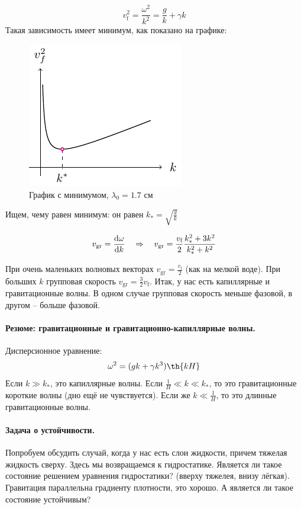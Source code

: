\begin{equation}
    v_\text{f}^2 = \frac{\omega^2}{k^2} = \frac{g}{k}+\gamma k 
\end{equation}
Такая зависимость имеет минимум, как показано на графике:
\begin{figure}[H]
    \centering
    \includegraphics[scale=1.5]{img/min}
    \caption{График с минимумом, $\lambda_0 = 1.7 \text{ см}$}
    \label{fig:figure1}
\end{figure}

Ищем, чему равен минимум: он равен $k_{*} = \sqrt{\frac{g}{k}}$

\begin{equation}
    v_\text{gr} = \dv{\omega}{k} \quad \Rightarrow \quad 
    v_\text{gr} = \frac{v_\text{f}}{2}\frac{k_{*}^2+3k^2}{k_{*}^2+k^2}
\end{equation}

При очень маленьких волновых векторах $v_\text{gr} = \frac{v_\text{f}}{2}$ (как на мелкой воде). 
При больших $k$ групповая скорость $v_\text{gr} = \frac{3}{2}v_\text{f}$.
Итак, у нас есть капиллярные и гравитационные волны.
В одном случае групповая скорость меньше фазовой, в другом -- больше фазовой. 

\paragraph{Резюме: гравитационные и гравитационно-капиллярные волны.}
Дисперсионное уравнение:
\begin{equation}
    \omega^2 = (gk+\gamma k^3)\th{kH}
\end{equation}
Если $k \gg k_*$, это капиллярные волны. 
Если $\frac{1}{H} \ll k \ll k_*$, то это гравитационные короткие волны (дно ещё не чувствуется).
Если же $k \ll \frac{1}{H}$, то это длинные гравитационные волны.


\paragraph{Задача о устойчивости.} Попробуем обсудить случай, когда у нас есть слои жидкости, причем тяжелая жидкость сверху. 
Здесь мы возвращаемся к гидростатике.
Является ли такое состояние решением уравнения гидростатики? (вверху тяжелея, внизу лёгкая).
Гравитация параллельна градиенту плотности, это хорошо. 
А является ли такое состояние устойчивым? 

